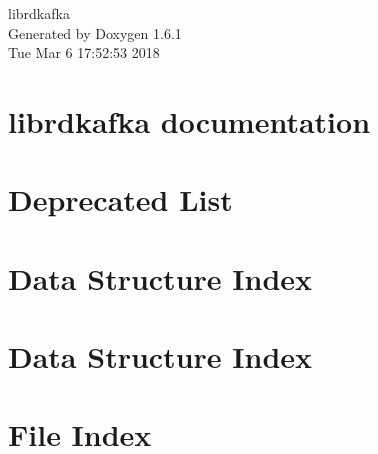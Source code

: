\documentclass[a4paper]{book}
\begin{document}
\hypersetup{pageanchor=false}
\begin{titlepage}
\vspace*{7cm}
\begin{center}
{\Large librdkafka }\\
\vspace*{1cm}
{\large Generated by Doxygen 1.6.1}\\
\vspace*{0.5cm}
{\small Tue Mar 6 17:52:53 2018}\\
\end{center}
\end{titlepage}
\clearemptydoublepage
{}
\tableofcontents
\clearemptydoublepage
{}
\hypersetup{pageanchor=true}
\chapter{librdkafka documentation}
\label{index}\hypertarget{index}{}
\chapter{Deprecated List}
\label{deprecated}
\hypertarget{deprecated}{}

\chapter{Data Structure Index}

\chapter{Data Structure Index}

\chapter{File Index}

\end{document}

